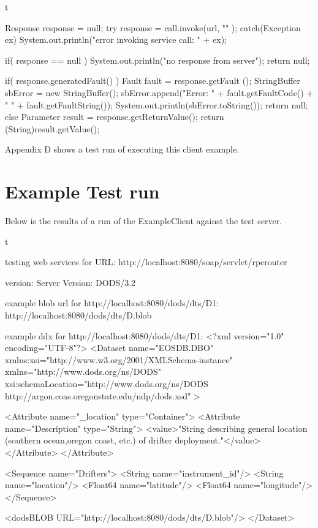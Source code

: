 \documentclass[justify]{dods-paper}
\begin{document}
\begin{vcode}{t}
{{		Response response = null;
		try {
			response = call.invoke(url, "" );
		} catch(Exception ex) {
			System.out.println("error invoking service call: " + ex);
		}

		if( response == null ){
			System.out.println("no response from server");
			return null;
		}

		if( response.generatedFault() ) {
			Fault fault = response.getFault ();
			StringBuffer sbError = new StringBuffer();
			sbError.append("Error: " + fault.getFaultCode() + " " + fault.getFaultString());
			System.out.println(sbError.toString());
			return null;
		} else {
			Parameter result = response.getReturnValue();
			return (String)result.getValue();
		}
	}
}
		
\end{vcode}

Appendix D shows a test run of executing this client example.







\section{Example Test run}

Below is the results of a run of the ExampleClient against the test server.

\begin{vcode}{t}

testing web services for URL: http://localhost:8080/soap/servlet/rpcrouter

version: Server Version: DODS/3.2

example blob url for http://localhost:8080/dods/dts/D1: 
http://localhost:8080/dods/dts/D.blob

example ddx for http://localhost:8080/dods/dts/D1: 
<?xml version="1.0" encoding="UTF-8"?>
<Dataset name="EOSDB.DBO"
xmlns:xsi="http://www.w3.org/2001/XMLSchema-instance"
xmlns="http://www.dods.org/ns/DODS"
xsi:schemaLocation="http://www.dods.org/ns/DODS  http://argon.coas.oregonstate.edu/ndp/dods.xsd" >

	<Attribute name="_location" type="Container">
		<Attribute name="Description" type="String">
			<value>"String describing general location (southern ocean,oregon coast, etc.) of drifter deployment."</value>
		</Attribute>
	</Attribute>

	<Sequence name="Drifters">
		<String name="instrument_id"/>
		<String name="location"/>
		<Float64 name="latitude"/>
		<Float64 name="longitude"/>
	</Sequence>

	<dodsBLOB URL="http://localhost:8080/dods/dts/D.blob"/>
</Dataset>

\end{vcode}
\end{document}
